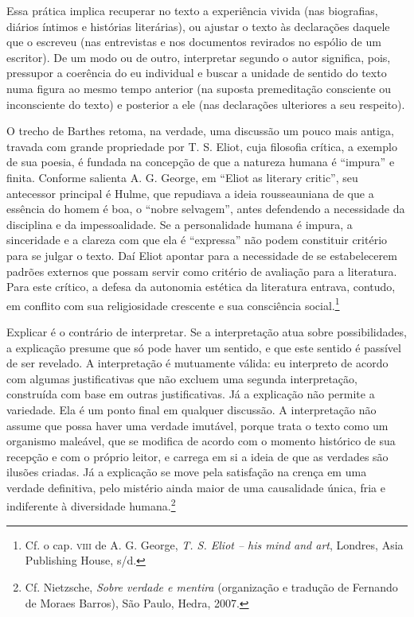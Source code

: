 Essa prática implica recuperar no texto a experiência vivida (nas
biografias, diários íntimos e histórias literárias), ou ajustar o texto
às declarações daquele que o escreveu (nas entrevistas e nos documentos
revirados no espólio de um escritor). De um modo ou de outro,
interpretar segundo o autor significa, pois, pressupor a coerência do eu
individual e buscar a unidade de sentido do texto numa figura ao mesmo
tempo anterior (na suposta premeditação consciente ou inconsciente do
texto) e posterior a ele (nas declarações ulteriores a seu respeito).

O trecho de Barthes retoma, na verdade, uma discussão um pouco mais
antiga, travada com grande propriedade por T. S. Eliot, cuja filosofia
crítica, a exemplo de sua poesia, é fundada na concepção de que a
natureza humana é ``impura'' e finita. Conforme salienta A. G. George,
em ``Eliot as literary critic'', seu antecessor principal é Hulme, que
repudiava a ideia rousseauniana de que a essência do homem é boa, o
``nobre selvagem'', antes defendendo a necessidade da disciplina e da
impessoalidade. Se a personalidade humana é impura, a sinceridade e a
clareza com que ela é ``expressa'' não podem constituir critério para se
julgar o texto. Daí Eliot apontar para a necessidade de se estabelecerem
padrões externos que possam servir como critério de avaliação para a
literatura. Para este crítico, a defesa da autonomia estética da
literatura entrava, contudo, em conflito com sua religiosidade crescente
e sua consciência social.\footnote{Cf. o cap. \textsc{viii} de A. G.
  George, \emph{T. S. Eliot -- his mind and art}, Londres, Asia
  Publishing House, s/d.}

Explicar é o contrário de interpretar. Se a interpretação atua sobre
possibilidades, a explicação presume que só pode haver um sentido, e que
este sentido é passível de ser revelado. A interpretação é mutuamente
válida: eu interpreto de acordo com algumas justificativas que não
excluem uma segunda interpretação, construída com base em outras
justificativas. Já a explicação não permite a variedade. Ela é um ponto
final em qualquer discussão. A interpretação não assume que possa haver
uma verdade imutável, porque trata o texto como um organismo maleável,
que se modifica de acordo com o momento histórico de sua recepção e com
o próprio leitor, e carrega em si a ideia de que as verdades são ilusões
criadas. Já a explicação se move pela satisfação na crença em uma
verdade definitiva, pelo mistério ainda maior de uma causalidade única,
fria e indiferente à diversidade humana.\footnote{Cf. Nietzsche,
  \emph{Sobre verdade e mentira} (organização e tradução de Fernando de
  Moraes Barros), São Paulo, Hedra, 2007.}

